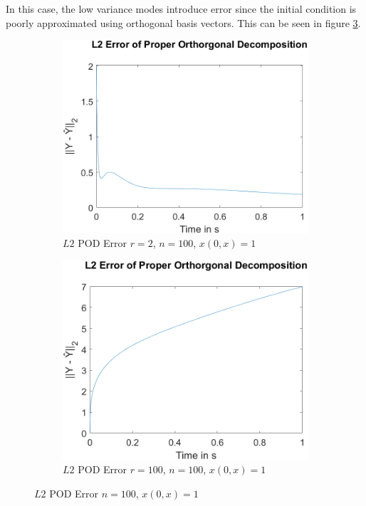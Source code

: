 In this case, the low variance modes introduce error since the initial condition is poorly approximated using orthogonal basis vectors.
This can be seen in figure \ref{fig-pod-100}.
\begin{figure}[H]
\begin{subfigure}[b]{0.5\textwidth}
\centering
\includegraphics[width=\textwidth]{images/L2_Proper Orthorgonal Decomposition_2_100}
\caption{$L2$ POD Error $r=2$, $n=100$, $x(0, x) = 1$}
\label{fig:fig-pod-2-100}
\end{subfigure}
\begin{subfigure}[b]{0.5\textwidth}
\centering
\includegraphics[width=\textwidth]{images/L2_Proper Orthorgonal Decomposition_100_100}
\caption{$L2$ POD Error $r=100$, $n=100$, $x(0, x) = 1$}
\label{fig:fig-pod-100-100}
\end{subfigure}
\caption{$L2$ POD Error $n=100$, $x(0, x) = 1$}
\label{fig-pod-100}
\end{figure}
